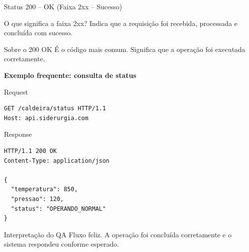 \documentclass[9pt]{beamer}
\begin{document}
\begin{frame}[fragile]{Status 200 – OK (Faixa 2xx – Sucesso)}

\begin{block}{O que significa a faixa 2xx?}
Indica que a requisição foi recebida,
processada e concluída com sucesso.
\end{block}

\begin{block}{Sobre o 200 OK}
É o código mais comum.
Significa que a operação foi executada corretamente.
\end{block}

\textbf{Exemplo frequente: consulta de status}

\begin{block}{Request}
\begin{verbatim}
GET /caldeira/status HTTP/1.1
Host: api.siderurgia.com
\end{verbatim}
\end{block}

\begin{block}{Response}
\begin{verbatim}
HTTP/1.1 200 OK
Content-Type: application/json

{
  "temperatura": 850,
  "pressao": 120,
  "status": "OPERANDO_NORMAL"
}
\end{verbatim}
\end{block}

\begin{block}{Interpretação do QA}
Fluxo feliz.
A operação foi concluída corretamente
e o sistema respondeu conforme esperado.
\end{block}

\end{frame}
\end{document}
